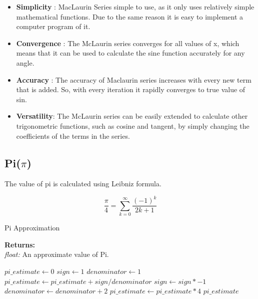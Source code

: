     \begin{itemize}
      \item \textbf{Simplicity} : MacLaurin Series simple to use, as it only uses relatively simple mathematical functions. Due to the same reason it is easy to implement a computer program of it.
      \item \textbf{Convergence} : The McLaurin series converges for all values of x, which means that it can be used to calculate the sine function accurately for any angle.
      \item  \textbf{Accuracy} : The accuracy of Maclaurin series increases with every new term that is added. So, with every iteration it rapidly converges to true value of sin.
      \item \textbf{Versatility}: The McLaurin series can be easily extended to calculate other trigonometric functions, such as cosine and tangent, by simply changing the coefficients of the terms in the series.
    \end{itemize}

  \subsection{Pi($\pi$)}
    \begin{flushleft}
      The value of pi is calculated using Leibniz formula\cite{Ferraro2008}.
    \end{flushleft}
    $${\frac {\pi }{4}}=\sum _{k=0}^{\infty }{\frac {(-1)^{k}}{2k+1}}$$

    \begin{algorithm}
      \caption{Pi Approximation}\label{Pi Approximation}
        \begin{tabbing}
          \textbf{Returns:}\\
            \hspace{1em}\textit{float:} An approximate value of Pi.
        \end{tabbing}
        \vspace{1 em}
      \begin{algorithmic}[1]
        \State $pi\_estimate \gets 0$
        \State $sign \gets 1$
        \State $denominator \gets 1$
          \State $pi\_estimate \gets pi\_estimate + sign / denominator$ 
          \State $sign \gets sign * -1$
          \State $denominator \gets denominator + 2$ 
        \EndFor
        \State $pi\_estimate \gets pi\_estimate * 4$ 
        \State \Return $pi\_estimate$
      \end{algorithmic}
    \end{algorithm}

